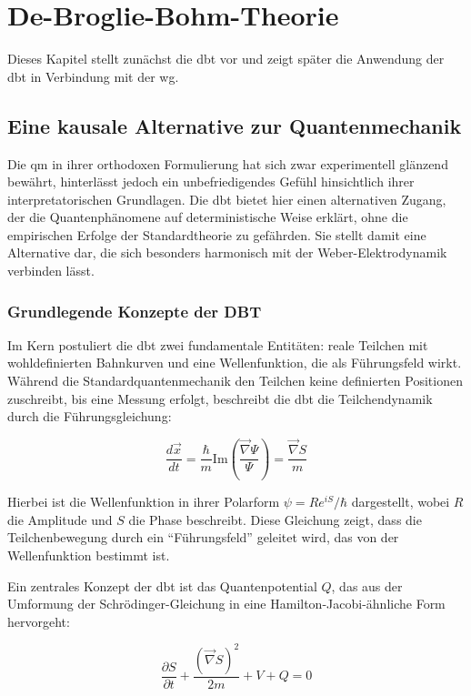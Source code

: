 \chapter{De-Broglie-Bohm-Theorie}
Dieses Kapitel stellt zunächst die \gls{dbt} vor und zeigt später die Anwendung der \gls{dbt} in Verbindung mit der \gls{wg}.

\section{Eine kausale Alternative zur Quantenmechanik}
Die \gls{qm} in ihrer orthodoxen Formulierung hat sich zwar experimentell glänzend bewährt, hinterlässt jedoch ein unbefriedigendes Gefühl hinsichtlich ihrer
interpretatorischen Grundlagen. Die \gls{dbt} bietet hier einen alternativen Zugang, der die Quantenphänomene auf deterministische Weise erklärt, ohne die empirischen
Erfolge der Standardtheorie zu gefährden. Sie stellt damit eine Alternative dar, die sich besonders harmonisch mit der Weber-Elektrodynamik verbinden lässt.

\subsection{Grundlegende Konzepte der DBT}
Im Kern postuliert die \gls{dbt} zwei fundamentale Entitäten: reale Teilchen mit wohldefinierten Bahnkurven und eine Wellenfunktion, die als Führungsfeld wirkt. Während die
Standardquantenmechanik den Teilchen keine definierten Positionen zuschreibt, bis eine Messung erfolgt, beschreibt die \gls{dbt} die Teilchendynamik durch die Führungsgleichung:

\begin{equation}
    \frac{d\vec{x}}{dt} = \frac{\hbar}{m} \text{Im} \left( \frac{\vec{\nabla} \Psi}{\Psi} \right) = \frac{\vec{\nabla} S}{m}
\end{equation}

Hierbei ist die Wellenfunktion in ihrer Polarform $\psi = R e^{iS}/\hbar$ dargestellt, wobei $R$ die Amplitude und $S$ die Phase beschreibt. Diese Gleichung zeigt, dass die
Teilchenbewegung durch ein \enquote{Führungsfeld} geleitet wird, das von der Wellenfunktion bestimmt ist.

Ein zentrales Konzept der \gls{dbt} ist das Quantenpotential $Q$, das aus der Umformung der Schrödinger-Gleichung in eine Hamilton-Jacobi-ähnliche Form hervorgeht:

\begin{equation}
    \frac{\partial S}{\partial t} + \frac{(\vec{\nabla} S)^2}{2m} + V + Q = 0
\end{equation}

